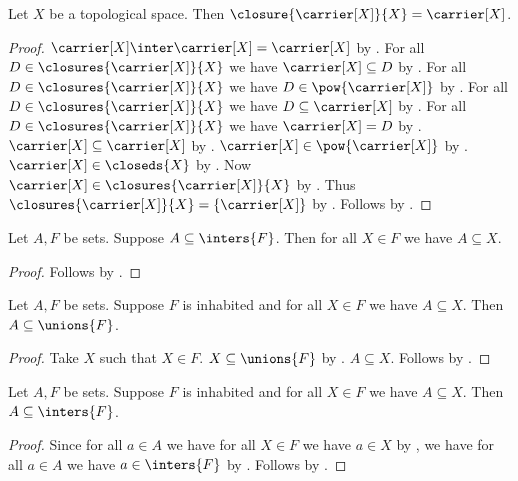 \begin{proposition}\label{closure_carrier}
    Let $X$ be a topological space.
    Then $\closure{\carrier[X]}{X} = \carrier[X]$.
\end{proposition}
\begin{proof}
    $\carrier[X]\inter\carrier[X]=\carrier[X]$
        by .
    For all $D\in\closures{\carrier[X]}{X}$ we have $\carrier[X]\subseteq D$
        by .
    For all $D\in\closures{\carrier[X]}{X}$ we have
        $D\in\pow{\carrier[X]}$ by .
    For all $D\in\closures{\carrier[X]}{X}$ we have $D\subseteq\carrier[X]$
        by .
    For all $D\in\closures{\carrier[X]}{X}$ we have $\carrier[X] = D$
        by .
    $\carrier[X]\subseteq\carrier[X]$ by .
    $\carrier[X]\in\pow{\carrier[X]}$ by .
    $\carrier[X]\in\closeds{X}$ by
        .
    Now $\carrier[X]\in\closures{\carrier[X]}{X}$
        by .
    Thus $\closures{\carrier[X]}{X} = \{\carrier[X]\}$
        by .
    Follows by .
\end{proof}

\begin{proposition}\label{subseteq_inters_iff_to_right}
    Let $A,F$ be sets.
    Suppose $A \subseteq \inters{F}$.
    Then for all $X \in F$ we have $A \subseteq X$.
\end{proposition}
\begin{proof}
    Follows by .
\end{proof}


\begin{proposition}\label{subseteq_of_all_then_subset_of_union}
    Let $A,F$ be sets.
    Suppose $F$ is inhabited and
        for all $X \in F$ we have $A \subseteq X$.
    Then $A \subseteq \unions{F}$.
\end{proposition}
\begin{proof}
    Take $X$ such that $X\in F$.
    $X\subseteq\unions{F}$ by .
    $A\subseteq X$.
    Follows by .
\end{proof}



\begin{proposition}\label{subseteq_inters_iff_to_left}
    Let $A,F$ be sets.
    Suppose $F$ is inhabited and
        for all $X \in F$ we have $A \subseteq X$.
    Then $A \subseteq \inters{F}$.
\end{proposition}
\begin{proof}
    Since for all $a\in A$ we have for all $X\in F$ we have $a\in X$
        by ,
    we have for all $a\in A$ we have $a\in\inters{F}$
        by .
    Follows by .
\end{proof}

